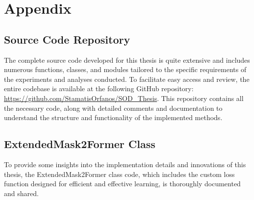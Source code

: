 \chapter{Appendix}


\section{Source Code Repository}

The complete source code developed for this thesis is quite extensive and includes numerous functions, classes, and modules tailored to 
the specific requirements of the experiments and analyses conducted. To facilitate easy access and review, the entire codebase is available 
at the following GitHub repository: \url{https://github.com/StamatisOrfanos/SOD_Thesis}. This repository contains all the necessary code, 
along with detailed comments and documentation to understand the structure and functionality of the implemented methods.


\section{ExtendedMask2Former Class}
To provide some insights into the implementation details and innovations of this thesis, the ExtendedMask2Former class code, which includes the custom loss function 
designed for efficient and effective learning, is thoroughly documented and shared.


